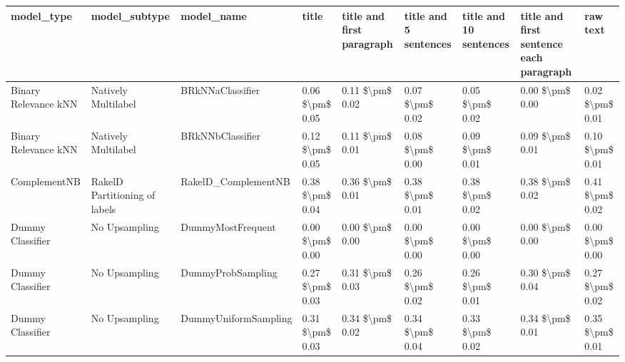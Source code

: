 \begin{tabular}{lllllllll}
\toprule
                     model\_type &                 model\_subtype &                                   model\_name &           title & title and first paragraph & title and 5 sentences & title and 10 sentences & title and first sentence each paragraph &            raw text \\
\midrule
           Binary Relevance kNN &           Natively Multilabel &                             BRkNNaClassifier & 0.06 \$\textbackslash pm\$ 0.05 &           0.11 \$\textbackslash pm\$ 0.02 &       0.07 \$\textbackslash pm\$ 0.02 &        0.05 \$\textbackslash pm\$ 0.02 &                         0.00 \$\textbackslash pm\$ 0.00 &     0.02 \$\textbackslash pm\$ 0.01 \\
           Binary Relevance kNN &           Natively Multilabel &                             BRkNNbClassifier & 0.12 \$\textbackslash pm\$ 0.05 &           0.11 \$\textbackslash pm\$ 0.01 &       0.08 \$\textbackslash pm\$ 0.00 &        0.09 \$\textbackslash pm\$ 0.01 &                         0.09 \$\textbackslash pm\$ 0.01 &     0.10 \$\textbackslash pm\$ 0.01 \\
                   ComplementNB & RakelD Partitioning of labels &                          RakelD\_ComplementNB & 0.38 \$\textbackslash pm\$ 0.04 &           0.36 \$\textbackslash pm\$ 0.01 &       0.38 \$\textbackslash pm\$ 0.01 &        0.38 \$\textbackslash pm\$ 0.02 &                         0.38 \$\textbackslash pm\$ 0.02 &     0.41 \$\textbackslash pm\$ 0.02 \\
               Dummy Classifier &                 No Upsampling &                            DummyMostFrequent & 0.00 \$\textbackslash pm\$ 0.00 &           0.00 \$\textbackslash pm\$ 0.00 &       0.00 \$\textbackslash pm\$ 0.00 &        0.00 \$\textbackslash pm\$ 0.00 &                         0.00 \$\textbackslash pm\$ 0.00 &     0.00 \$\textbackslash pm\$ 0.00 \\
               Dummy Classifier &                 No Upsampling &                            DummyProbSampling & 0.27 \$\textbackslash pm\$ 0.03 &           0.31 \$\textbackslash pm\$ 0.03 &       0.26 \$\textbackslash pm\$ 0.02 &        0.26 \$\textbackslash pm\$ 0.01 &                         0.30 \$\textbackslash pm\$ 0.04 &     0.27 \$\textbackslash pm\$ 0.02 \\
               Dummy Classifier &                 No Upsampling &                         DummyUniformSampling & 0.31 \$\textbackslash pm\$ 0.03 &           0.34 \$\textbackslash pm\$ 0.02 &       0.34 \$\textbackslash pm\$ 0.04 &        0.33 \$\textbackslash pm\$ 0.02 &                         0.34 \$\textbackslash pm\$ 0.01 &     0.35 \$\textbackslash pm\$ 0.01 \\

\end{tabular}
